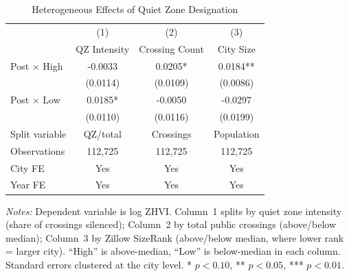 \begin{table}[t]
\centering
\caption{Heterogeneous Effects of Quiet Zone Designation}
\label{tab:heterogeneity}
\begin{tabular}{lccc}
\hline\hline
 & (1) & (2) & (3) \\
 & QZ Intensity & Crossing Count & City Size \\
\hline
Post $\times$ High & -0.0033 & 0.0205* & 0.0184** \\
 & (0.0114) & (0.0109) & (0.0086) \\
Post $\times$ Low & 0.0185* & -0.0050 & -0.0297 \\
 & (0.0110) & (0.0116) & (0.0199) \\
\hline
Split variable & QZ/total & Crossings & Population \\
Observations & 112,725 & 112,725 & 112,725 \\
City FE & Yes & Yes & Yes \\
Year FE & Yes & Yes & Yes \\
\hline\hline
\end{tabular}
\par\vspace{0.3em}
{\footnotesize
\textit{Notes:} Dependent variable is log ZHVI. Column~1 splits by quiet zone intensity (share of crossings silenced); Column~2 by total public crossings (above/below median); Column~3 by Zillow SizeRank (above/below median, where lower rank = larger city). ``High'' is above-median, ``Low'' is below-median in each column. Standard errors clustered at the city level. * $p<0.10$, ** $p<0.05$, *** $p<0.01$.
}
\end{table}

